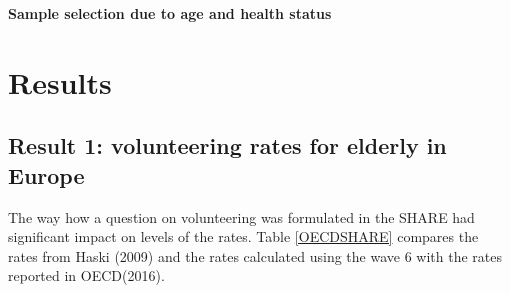 \documentclass[10pt, letterpaper]{article}
\begin{document}
\begin{spacing}{1.4}
\textbf{Sample selection due to age and health status }\\

\section{Results}

\subsection{Result 1: volunteering rates for elderly in Europe}

The way how a question on volunteering was formulated in the SHARE had
significant impact on levels of the rates. Table \ref{OECDSHARE}  compares the rates from Haski (2009) and the rates calculated using the wave 6 with the rates reported in OECD(2016).


\begin{spacing}{.9}
	 
      \label{OECDSHARE} 
\end{spacing}


\end{spacing}
\end{document}
